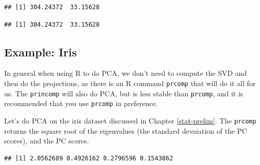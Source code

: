 \documentclass[]{book}
\newenvironment{Shaded}{\begin{snugshade}}{\end{snugshade}}
\newcommand{\CommentTok}[1]{\textcolor[rgb]{0.56,0.35,0.01}{\textit{#1}}}
\newcommand{\DecValTok}[1]{\textcolor[rgb]{0.00,0.00,0.81}{#1}}
\newcommand{\KeywordTok}[1]{\textcolor[rgb]{0.13,0.29,0.53}{\textbf{#1}}}
\newcommand{\NormalTok}[1]{#1}
\newcommand{\OperatorTok}[1]{\textcolor[rgb]{0.81,0.36,0.00}{\textbf{#1}}}
\newcommand{\StringTok}[1]{\textcolor[rgb]{0.31,0.60,0.02}{#1}}
\theoremstyle{definition}
\theoremstyle{definition}
\theoremstyle{definition}
\theoremstyle{remark}
\begin{document}
\begin{verbatim}
## [1] 304.24372  33.15628
\end{verbatim}

\begin{Shaded}
\end{Shaded}

\begin{verbatim}
## [1] 304.24372  33.15628
\end{verbatim}

\hypertarget{example-iris}{%
\subsection{Example: Iris}\label{example-iris}}

In general when using R to do PCA, we don't need to compute the SVD and then do the projections, as there is an R command \texttt{prcomp} that will do it all for us. The \texttt{princomp} will also do PCA, but is less stable than \texttt{prcomp}, and it is recommended that you use \texttt{prcomp} in preference.

Let's do PCA on the iris dataset discussed in Chapter \ref{stat-prelim}. The \texttt{prcomp} returns the square root of the eigenvalues (the standard devaiation of the PC scores), and the PC scores.

\begin{Shaded}
\end{Shaded}

\begin{verbatim}
## [1] 2.0562689 0.4926162 0.2796596 0.1543862
\end{verbatim}

\begin{Shaded}
\end{Shaded}
\end{document}
